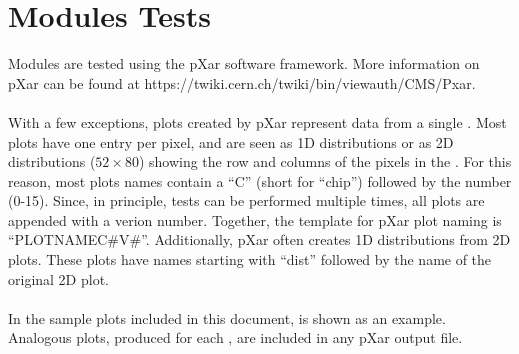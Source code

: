 \section{Modules Tests}
\label{s:tests}

Modules are tested using the pXar software framework.  
More information on pXar can be found at https://twiki.cern.ch/twiki/bin/viewauth/CMS/Pxar.
\\\\
With a few exceptions, plots created by pXar represent data from a single \roc.
Most \roc plots have one entry per pixel, and are seen as 1D distributions
or as 2D distributions ($52\times80$) showing the row and columns of the pixels in the \roc.
For this reason, most plots names contain a ``C'' (short for ``chip'') followed by the  \roc number (0-15).
Since, in principle, tests can be performed multiple times, all plots are appended with a verion number.
Together, the template for pXar plot naming is ``PLOT\textunderscore NAME\textunderscore C\#\textunderscore V\#''.
Additionally, pXar often creates 1D distributions from 2D \roc plots.  
These plots have names starting with ``dist\textunderscore'' followed by the name of the original 2D plot.
\\\\
In the sample plots included in this document,  is shown as an example.
Analogous plots, produced for each \roc, are included in any pXar output file.




















